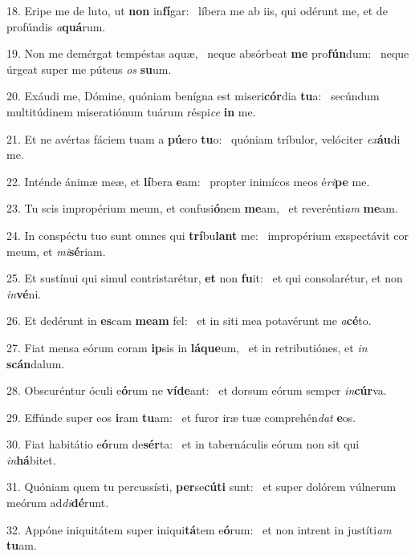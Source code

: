 18. Eripe me de luto, ut \textbf{non} in\textbf{fí}gar: \ast\  líbera me ab iis, qui odérunt me, et de profúndis \textit{a}\textbf{quá}rum.\

19. Non me demérgat tempéstas aquæ, \dag\  neque absórbeat \textbf{me} pro\textbf{fún}dum: \ast\  neque úrgeat super me púteus \textit{os} \textbf{su}um.\

20. Exáudi me, Dómine, quóniam benígna est miseri\textbf{cór}dia \textbf{tu}a: \ast\  secúndum multitúdinem miseratiónum tuárum réspi\textit{ce} \textbf{in} me.\

21. Et ne avértas fáciem tuam a \textbf{pú}ero \textbf{tu}o: \ast\  quóniam tríbulor, velóciter \textit{ex}\textbf{áu}di me.\

22. Inténde ánimæ meæ, et \textbf{lí}bera \textbf{e}am: \ast\  propter inimícos meos é\textit{ri}\textbf{pe} me.\

23. Tu scis impropérium meum, et confusi\textbf{ó}nem \textbf{me}am, \ast\  et reverénti\textit{am} \textbf{me}am.\

24. In conspéctu tuo sunt omnes qui \textbf{trí}bu\textbf{lant} me: \ast\  impropérium exspectávit cor meum, et \textit{mi}\textbf{sé}riam.\

25. Et sustínui qui simul contristarétur, \textbf{et} non \textbf{fu}it: \ast\  et qui consolarétur, et non \textit{in}\textbf{vé}ni.\

26. Et dedérunt in \textbf{es}cam \textbf{me}\textbf{am} fel: \ast\  et in siti mea potavérunt me \textit{a}\textbf{cé}to.\

27. Fiat mensa eórum coram \textbf{ip}sis in \textbf{lá}\textbf{que}um, \ast\  et in retributiónes, et \textit{in} \textbf{scán}dalum.\

28. Obscuréntur óculi e\textbf{ó}rum ne \textbf{ví}\textbf{de}ant: \ast\  et dorsum eórum semper \textit{in}\textbf{cúr}va.\

29. Effúnde super eos \textbf{i}ram \textbf{tu}am: \ast\  et furor iræ tuæ comprehén\textit{dat} \textbf{e}os.\

30. Fiat habitátio e\textbf{ó}rum de\textbf{sér}ta: \ast\  et in tabernáculis eórum non sit qui \textit{in}\textbf{há}bitet.\

31. Quóniam quem tu percussísti, \textbf{per}se\textbf{cú}\textbf{ti} sunt: \ast\  et super dolórem vúlnerum meórum ad\textit{di}\textbf{dé}runt.\

32. Appóne iniquitátem super iniqui\textbf{tá}tem e\textbf{ó}rum: \ast\  et non intrent in justíti\textit{am} \textbf{tu}am.\

